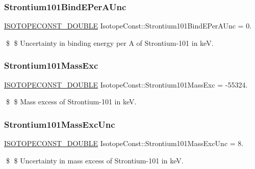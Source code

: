 \subsubsection{\texorpdfstring{Strontium101\+Bind\+E\+Per\+A\+Unc}{Strontium101BindEPerAUnc}}
{\footnotesize\ttfamily \mbox{\hyperlink{group___isotope_const-_macros_ga8f45a7272ce02c0b4c65c44636ed719a}{I\+S\+O\+T\+O\+P\+E\+C\+O\+N\+S\+T\+\_\+\+D\+O\+U\+B\+LE}} Isotope\+Const\+::\+Strontium101\+Bind\+E\+Per\+A\+Unc = 0.}

\$ \$ Uncertainty in binding energy per A of Strontium-\/101 in keV. \mbox{\label{group___isotope_const-_strontium-_sr101_ga1aa00b08a0a3c016494b1d84bf8eee50}} 
\subsubsection{\texorpdfstring{Strontium101\+Mass\+Exc}{Strontium101MassExc}}
{\footnotesize\ttfamily \mbox{\hyperlink{group___isotope_const-_macros_ga8f45a7272ce02c0b4c65c44636ed719a}{I\+S\+O\+T\+O\+P\+E\+C\+O\+N\+S\+T\+\_\+\+D\+O\+U\+B\+LE}} Isotope\+Const\+::\+Strontium101\+Mass\+Exc = -\/55324.}

\$ \$ Mass excess of Strontium-\/101 in keV. \mbox{\label{group___isotope_const-_strontium-_sr101_ga244c881a16c521c9a398363dc36c9bb2}} 
\subsubsection{\texorpdfstring{Strontium101\+Mass\+Exc\+Unc}{Strontium101MassExcUnc}}
{\footnotesize\ttfamily \mbox{\hyperlink{group___isotope_const-_macros_ga8f45a7272ce02c0b4c65c44636ed719a}{I\+S\+O\+T\+O\+P\+E\+C\+O\+N\+S\+T\+\_\+\+D\+O\+U\+B\+LE}} Isotope\+Const\+::\+Strontium101\+Mass\+Exc\+Unc = 8.}

\$ \$ Uncertainty in mass excess of Strontium-\/101 in keV. \mbox{\label{group___isotope_const-_strontium-_sr101_ga58ce6e2d3e3f405dde60c225396d612e}} 
